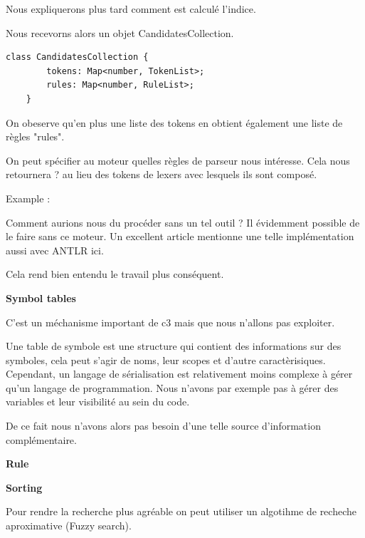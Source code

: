 \documentclass[
    iict, %
    il, %
]{heig-tb}
\begin{document}
Nous expliquerons plus tard comment est calculé l'indice.

Nous recevorns alors un objet CandidatesCollection.

\begin{lstlisting}[frame=single]
    class CandidatesCollection {
        tokens: Map<number, TokenList>;
        rules: Map<number, RuleList>;
    }
\end{lstlisting}


On obeserve qu'en plus une liste des tokens en obtient également une liste de règles "rules".


On peut spécifier au moteur quelles règles de parseur nous intéresse. Cela nous retournera ? au lieu des tokens de lexers avec lesquels ils sont composé.

Example :


Comment aurions nous du procéder sans un tel outil ?
Il évidemment possible de le faire sans ce moteur. Un excellent article mentionne une telle implémentation aussi avec ANTLR ici.

Cela rend bien entendu le travail plus conséquent.



\textbf{Symbol tables}

C'est un méchanisme important de c3 mais que nous n'allons pas exploiter.

Une table de symbole est une structure qui contient des informations sur des symboles, cela peut s'agir de noms, leur scopes et d'autre caractèrisiques.
Cependant, un langage de sérialisation est relativement moins complexe à gérer qu'un langage de programmation.
Nous n'avons par exemple pas à gérer des variables et leur visibilité au sein du code.

De ce fait nous n'avons alors pas besoin d'une telle source d'information complémentaire.


\textbf{Rule}



\textbf{Sorting}

Pour rendre la recherche plus agréable on peut utiliser un algotihme de recheche aproximative (Fuzzy search).
\end{document}
